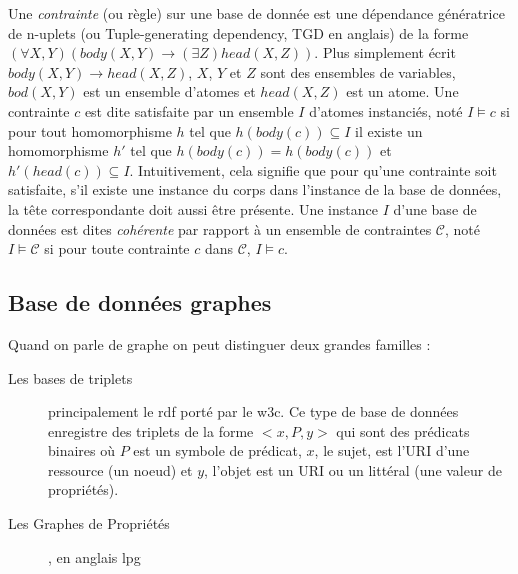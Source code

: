 Une \textit{contrainte} (ou règle) sur une base de donnée est une dépendance génératrice de n-uplets (ou Tuple-generating dependency, TGD en anglais) de la forme $(\forall X, Y)(body(X, Y) \to (\exists Z)head(X, Z))$.
Plus simplement écrit $body(X, Y) \to head(X, Z)$, $X$, $Y$ et $Z$ sont des ensembles de variables, $bod(X, Y)$ est un ensemble d'atomes et $head(X, Z)$ est un atome.
Une contrainte $c$ est dite satisfaite par un ensemble $I$ d'atomes instanciés, noté $I \vDash c$ si pour tout homomorphisme $h$ tel que $h(body(c)) \subseteq I$ il existe un homomorphisme $h'$ tel que $h(body(c)) = h(body(c))$ et $h'(head(c)) \subseteq I$.
Intuitivement, cela signifie que pour qu'une contrainte soit satisfaite, s'il existe une instance du corps dans l'instance de la base de données, la tête correspondante doit aussi être présente.
Une instance $I$ d'une base de données est dites \textit{cohérente} par rapport à un ensemble de contraintes $\mathcal{C}$, noté $I \vDash \mathcal{C}$ si pour toute contrainte $c$ dans $\mathcal{C}$, $I \vDash c$.

\subsection{Base de données graphes}

Quand on parle de  graphe on peut distinguer deux grandes familles :
\begin{description}
    \item[Les bases de triplets] principalement le \gls{rdf} porté par le \gls{w3c}.
        Ce type de base de données enregistre des triplets de la forme $<x, P, y>$ qui sont des prédicats binaires où $P$ est un symbole de prédicat, $x$, le sujet, est l'URI d'une ressource (un noeud) et $y$, l'objet est un URI ou un littéral (une valeur de propriétés).
    \item[Les Graphes de Propriétés], en anglais \gls{lpg}
\end{description}
